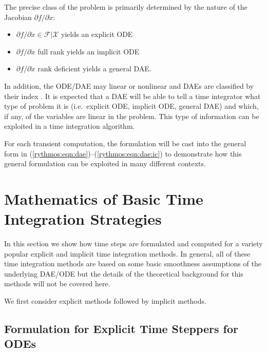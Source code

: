 \documentclass[pdf,ps2pdf,11pt]{SANDreport}
\begin{document}
The precise class of the problem is primarily determined by the nature of the
Jacobian ${}\partial f / {}\partial {}\dot{x}$:
%
\begin{itemize}
%
{}\item ${}\partial f / {}\partial {}\dot{x} {}\in {}\mathcal{F}|\mathcal{X}$ yields an explicit ODE
%
{}\item ${}\partial f / {}\partial {}\dot{x}$ full rank yields an implicit ODE
%
{}\item ${}\partial f / {}\partial {}\dot{x}$ rank deficient yields a general
DAE.
\end{itemize}
%
In addition, the ODE/DAE may linear or nonlinear and DAEs are classified by
their index \cite{BCP}.  It is expected that a DAE will be able to tell a time
integrator what type of problem it is (i.e.\ explicit ODE, implicit ODE,
general DAE) and which, if any, of the variables are linear in the problem.
This type of information can be exploited in a time integration algorithm.

For each transient computation, the formulation will be cast into the general
form in (\ref{rythmos:eqn:dae})--(\ref{rythmos:eqn:dae:ic}) to demonstrate how
this general formulation can be exploited in many different contexts.

\section{Mathematics of Basic Time Integration Strategies}

In this section we show how time steps are formulated and computed for a
variety popular explicit and implicit time integration methods.  In general,
all of these time integration methods are based on some basic smoothness
assumptions of the underlying DAE/ODE but the details of the theoretical
background for this methods will not be covered here.

We first consider explicit methods followed by implicit methods.

\subsection{Formulation for Explicit Time Steppers for ODEs}
\end{document}
